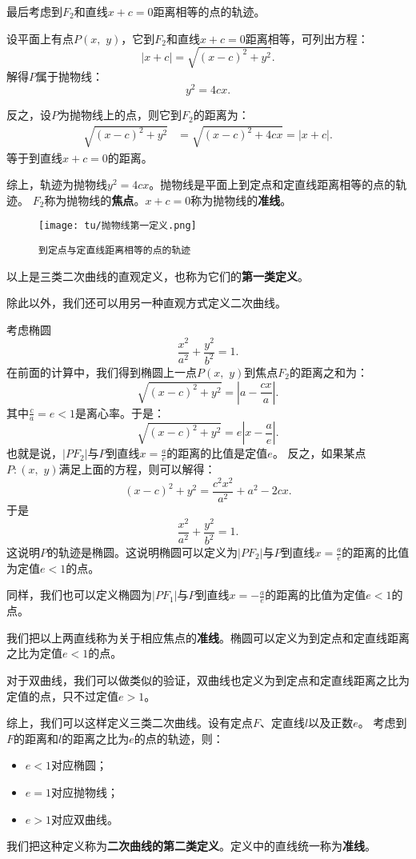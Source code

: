 \documentclass[12pt,UTF8]{ctexbook}
\theoremstyle{definition}
\theoremstyle{plain}
\begin{document}
最后考虑到$F_2$和直线$x + c = 0$距离相等的点的轨迹。

设平面上有点$P(x, \,\,y)$，它到$F_2$和直线$x + c = 0$距离相等，可列出方程：
$$ \left|x + c\right| = \sqrt{(x - c)^2 + y^2}.$$
解得$P$属于抛物线：
$$ y^2 = 4cx.$$

反之，设$P$为抛物线上的点，则它到$F_2$的距离为：
\begin{align*}
    \sqrt{(x - c)^2 + y^2} &= \sqrt{(x - c)^2 + 4cx} = |x + c|.
\end{align*}
等于到直线$x + c = 0$的距离。

综上，轨迹为抛物线$ y^2 = 4cx$。抛物线是平面上到定点和定直线距离相等的点的轨迹。
$F_2$称为抛物线的\textbf{焦点}。$x + c = 0$称为抛物线的\textbf{准线}。

\begin{figure}[h] 
    \centering
    \texttt{[image: tu/抛物线第一定义.png]}
    \caption*{\texttt{到定点与定直线距离相等的点的轨迹}}
\end{figure}

以上是三类二次曲线的直观定义，也称为它们的\textbf{第一类定义}。

除此以外，我们还可以用另一种直观方式定义二次曲线。

考虑椭圆
$$ \frac{x^2}{a^2} + \frac{y^2}{b^2} = 1.$$
在前面的计算中，我们得到椭圆上一点$P(x,\,\,y)$到焦点$F_2$的距离之和为：
$$ \sqrt{(x - c)^2 + y^2} = \left|a - \frac{cx}{a}\right|.$$
其中$\frac{c}{a} = e < 1$是离心率。于是：
$$  \sqrt{(x - c)^2 + y^2} = e\left|x - \frac{a}{e}\right| . $$
也就是说，$|PF_2|$与$P$到直线$x = \frac{a}{e}$的距离的比值是定值$e$。
反之，如果某点$P:(x,\,\,y)$满足上面的方程，则可以解得：
$$ (x - c)^2 + y^2 = \frac{c^2x^2}{a^2} + a^2 -2cx.$$
于是
$$ \frac{x^2}{a^2} + \frac{y^2}{b^2} = 1.$$
这说明$P$的轨迹是椭圆。这说明椭圆可以定义为$|PF_2|$与$P$到直线$x = \frac{a}{e}$的距离的比值为定值$e<1$的点。

同样，我们也可以定义椭圆为$|PF_1|$与$P$到直线$x = -\frac{a}{e}$的距离的比值为定值$e<1$的点。

我们把以上两直线称为关于相应焦点的\textbf{准线}。椭圆可以定义为到定点和定直线距离之比为定值$e<1$的点。

对于双曲线，我们可以做类似的验证，双曲线也定义为到定点和定直线距离之比为定值的点，只不过定值$e > 1$。

综上，我们可以这样定义三类二次曲线。设有定点$F$、定直线$l$以及正数$e$。
考虑到$F$的距离和$l$的距离之比为$e$的点的轨迹，则：
\begin{itemize}
    \item $e<1$对应椭圆；
    \item $e = 1$对应抛物线；
    \item $e >1$对应双曲线。
\end{itemize}
我们把这种定义称为\textbf{二次曲线的第二类定义}。定义中的直线统一称为\textbf{准线}。
\end{document}
